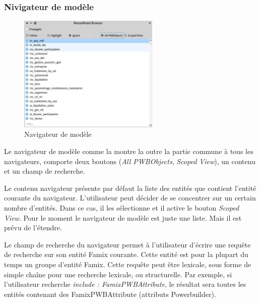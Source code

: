 \documentclass[a4paper]{article}
\begin{document}
\subsubsection{Nivigateur de modèle}
\label{sec:navigateurModel}
\begin{figure}[htbp]
  \begin{center}
  \includegraphics[width=0.6\textwidth]{./figures/modelBrowser.png}
  \caption{Navigateur de modèle}
  \label{fig:modelBrowser}
\end{center}
\vspace{-0.3cm}
\end{figure}
Le navigateur de modèle comme la montre la  outre la partie commune à tous les navigateurs, comporte deux boutons (\textit{All PWBObjects}, \textit{Scoped View}), un contenu et un champ de recherche.

Le contenu navigateur présente par défaut la liste des entités que contient l'entité courante du navigateur. 
L'utilisateur peut décider de se concentrer sur un certain nombre d'entités. Dans ce cas, il les sélectionne et il active le bouton \textit{Scoped View}.
Pour le moment le navigateur de modèle est juste une liste. Mais il est prévu de l'étendre.

Le champ de recherche du navigateur permet à l'utilisateur d'écrire une requête de recherche sur son entité Famix courante.
Cette entité est pour la plupart du temps un groupe d'entité Famix.
Cette requête peut être lexicale, sous forme de simple chaîne pour une recherche lexicale, ou structurelle.
Par exemple, si l'utilisateur recherche \textit{include : FamixPWBAttribute}, le résultat sera toutes les entités contenant des FamixPWBAttribute (attributs Powerbuilder).

\end{document}
